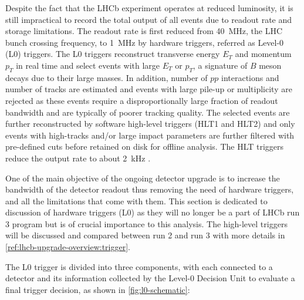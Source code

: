Despite the fact that the LHCb experiment operates at reduced luminosity,
it is still impractical to record the total output of all events due to readout
rate and storage limitations.
The readout rate is first reduced from 40~MHz,
the LHC bunch crossing frequency,
to 1~MHz by hardware triggers,
referred as Level-0 (L0) triggers.
The L0 triggers reconstruct transverse energy $E_T$ and momentum $p_T$ in real
time and select events with large $E_T$ or $p_T$,
a signature of $B$ meson decays due to their large masses.
In addition, number of $pp$ interactions and number of tracks are estimated and
events with large pile-up or multiplicity are rejected
as these events require a disproportionally large fraction of readout bandwidth
and are typically of poorer tracking quality.
The selected events are further reconstructed by software high-level
triggers (HLT1 and HLT2) and only events with high-\pt tracks and/or large
impact parameters are further filtered with pre-defined cuts before retained on
disk for offline analysis.
The HLT triggers reduce the output rate to about 2~kHz
\cite{The_LHCb_Collaboration_2008}.

One of the main objective of the ongoing detector upgrade is to increase the
bandwidth of the detector readout thus removing the need of hardware triggers,
and all the limitations that come with them.
This section is dedicated to discussion of hardware triggers (L0) as they
will no longer be a part of LHCb run 3 program but is of crucial importance to
this analysis.
The high-level triggers will be discussed and compared between run 2 and run 3
with more details in \cref{ref:lhcb-upgrade-overview:trigger}.

The L0 trigger is divided into three components, with each connected to a
detector and its information collected by the Level-0 Decision Unit to evaluate
a final trigger decision, as shown in \cref{fig:l0-schematic}:

